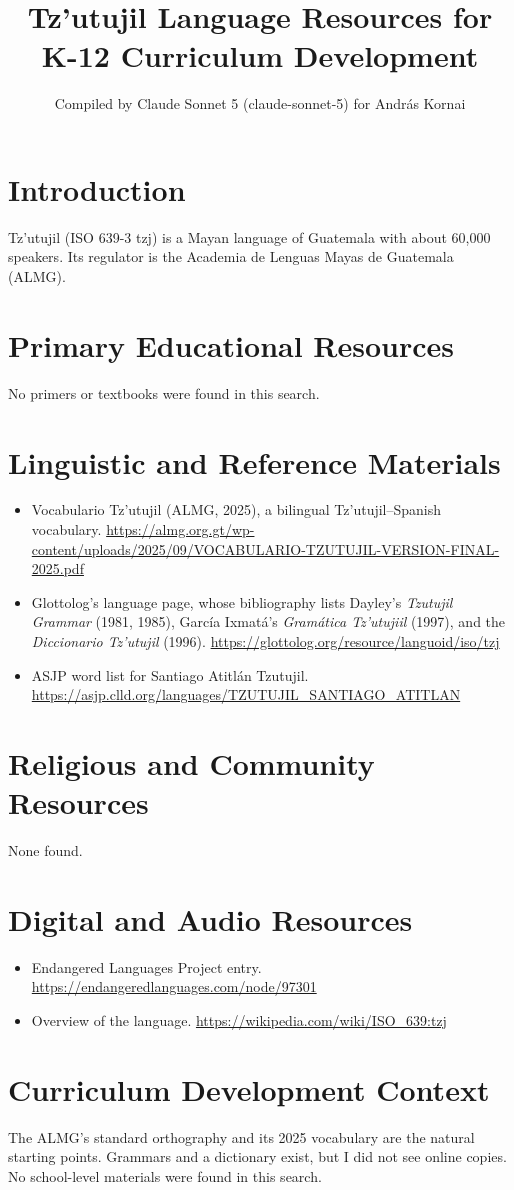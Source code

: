 \documentclass[12pt]{article}
\title{Tz'utujil Language Resources for K-12 Curriculum Development}
\author{Compiled by Claude Sonnet 5 (claude-sonnet-5) for Andr\'as Kornai}
\date{}
\begin{document}
\maketitle
\section{Introduction}
Tz'utujil (ISO 639-3 tzj) is a Mayan language of Guatemala with about 60,000 speakers. Its regulator is the Academia de Lenguas Mayas de Guatemala (ALMG).
\section{Primary Educational Resources}
No primers or textbooks were found in this search.
\section{Linguistic and Reference Materials}
\begin{itemize}
\item Vocabulario Tz'utujil (ALMG, 2025), a bilingual Tz'utujil--Spanish vocabulary. \url{https://almg.org.gt/wp-content/uploads/2025/09/VOCABULARIO-TZUTUJIL-VERSION-FINAL-2025.pdf}
\item Glottolog's language page, whose bibliography lists Dayley's \emph{Tzutujil Grammar} (1981, 1985), Garc\'ia Ixmat\'a's \emph{Gram\'atica Tz'utujiil} (1997), and the \emph{Diccionario Tz'utujil} (1996). \url{https://glottolog.org/resource/languoid/iso/tzj}
\item ASJP word list for Santiago Atitl\'an Tzutujil. \url{https://asjp.clld.org/languages/TZUTUJIL_SANTIAGO_ATITLAN}
\end{itemize}
\section{Religious and Community Resources}
None found.
\section{Digital and Audio Resources}
\begin{itemize}
\item Endangered Languages Project entry. \url{https://endangeredlanguages.com/node/97301}
\item Overview of the language. \url{https://wikipedia.com/wiki/ISO_639:tzj}
\end{itemize}
\section{Curriculum Development Context}
The ALMG's standard orthography and its 2025 vocabulary are the natural starting points. Grammars and a dictionary exist, but I did not see online copies. No school-level materials were found in this search.
\end{document}
